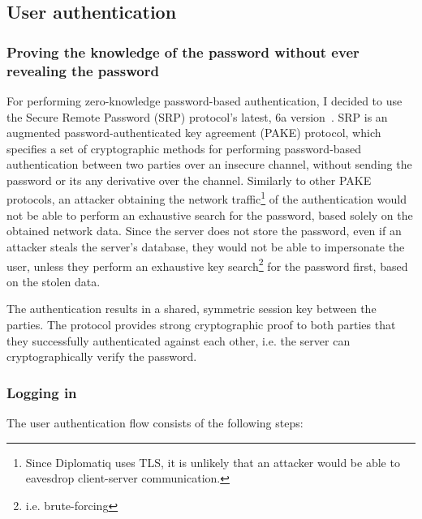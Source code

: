 \subsection{User authentication}

\subsubsection{Proving the knowledge of the password without ever revealing the password}

For performing zero-knowledge password-based authentication, I decided to use the Secure Remote Password (SRP) protocol's latest, 6a version~\cite{rfc2945}. SRP is an augmented password-authenticated key agreement (PAKE) protocol, which specifies a set of cryptographic methods for performing password-based authentication between two parties over an insecure channel, without sending the password or its any derivative over the channel. Similarly to other PAKE protocols, an attacker obtaining the network traffic\footnote{Since Diplomatiq uses TLS, it is unlikely that an attacker would be able to eavesdrop client-server communication.} of the authentication would not be able to perform an exhaustive search for the password, based solely on the obtained network data. Since the server does not store the password, even if an attacker steals the server's database, they would not be able to impersonate the user, unless they perform an exhaustive key search\footnote{i.e. brute-forcing} for the password first, based on the stolen data.

The authentication results in a shared, symmetric session key between the parties. The protocol provides strong cryptographic proof to both parties that they successfully authenticated against each other, i.e. the server can cryptographically verify the password.

\subsubsection{Logging in}

The user authentication flow consists of the following steps:

